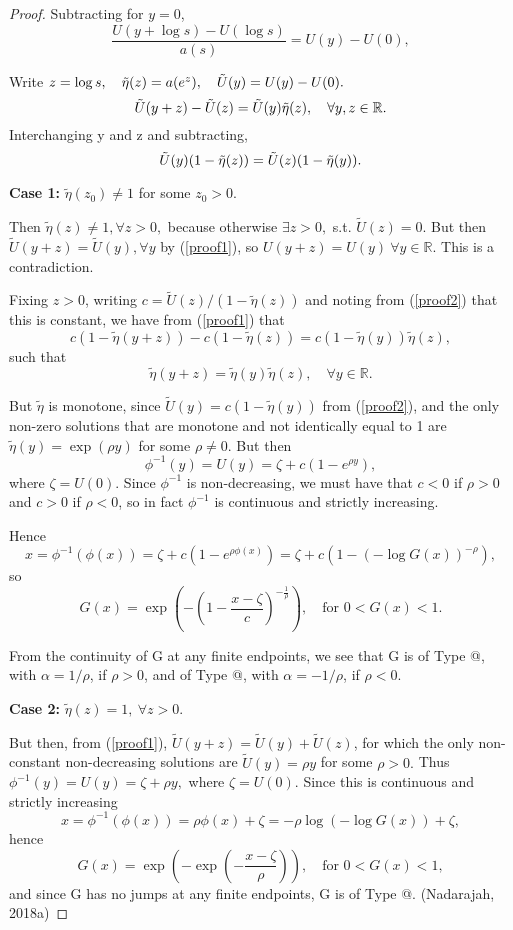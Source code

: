 \documentclass{article}
\makeatletter
\newcommand*{\rom}[1]{\expandafter\@slowromancap\romannumeral #1@}
\makeatother
\begin{document}
\begin{proof}
Subtracting for $y=0$,
$$\frac{U(y+\log s)-U(\log s)}{a(s)} = U(y) - U(0),$$

Write $z=\log s, \quad \tilde{\eta}(z)=a(e^{z}),\quad \Tilde{U}(y)=U(y)-U(0).$
\begin{equation}
    \Tilde{U}(y+z)-\Tilde{U}(z)=\Tilde{U}(y)\tilde{\eta}(z),\quad \forall y,z\in\mathbb{R}.\label{proof1}
\end{equation}
Interchanging y and z and subtracting,
\begin{equation}
    \Tilde{U}(y)(1-\tilde{\eta}(z))=\Tilde{U}(z)(1-\tilde{\eta}(y)).\label{proof2}
\end{equation}

\textbf{Case 1:} $\tilde{\eta}(z_0)\neq 1$ for some $z_0 > 0.$\vspace{0.5cm}

Then $\tilde{\eta}(z)\neq1, \forall z > 0,$ because otherwise $\exists z>0,$ s.t. $\tilde{U}(z) = 0.$ But then $\tilde{U}(y+z) =\tilde{U}(y),\forall y $ by (\ref{proof1}), so $U(y+z)=U(y) \ \forall y\in\mathbb{R}.$ This is a contradiction.

Fixing $z>0$, writing $c=\tilde{U}(z)/(1-\tilde{\eta}(z))$ and noting from (\ref{proof2}) that this is constant, we have from (\ref{proof1}) that
$$c(1-\tilde{\eta}(y+z))-c(1-\tilde{\eta}(z))=c(1-\tilde{\eta}(y))\tilde{\eta}(z),$$
such that
$$\tilde{\eta}(y+z)=\tilde{\eta}(y)\tilde{\eta}(z),\quad \forall y \in \mathbb{R}.$$

But $\tilde{\eta}$ is monotone, since $\tilde{U}(y)=c(1-\tilde{\eta}(y))$ from (\ref{proof2}), and the only non-zero solutions that are monotone and not identically equal to 1 are $\tilde{\eta}(y)=\exp(\rho y)$ for some $\rho \neq 0.$ But then
$$\phi^{-1}(y)=U(y)=\zeta + c(1-e^{\rho y}),$$
where $\zeta = U(0)$. Since $\phi^{-1}$ is non-decreasing, we must have that $c<0$ if $\rho>0$ and $c>0$ if $\rho<0$, so in fact $\phi^{-1}$ is continuous and strictly increasing.

Hence $$x=\phi^{-1}(\phi(x))=\zeta + c\left(1-e^{\rho\phi(x)}\right)=\zeta + c(1-(-\log G(x))^{-\rho}),$$
so $$G(x) = \exp\left(-\left(1-\frac{x-\zeta}{c}\right)^{-\frac{1}{\rho}}\right),\quad \text{for } 0<G(x)<1.$$

From the continuity of G at any finite endpoints, we see that G is of Type \rom{2}, with $\alpha=1/\rho$, if $\rho>0$, and of Type \rom{3}, with $\alpha = -1/\rho$, if $\rho <0.$\vspace{0.5cm}

\textbf{Case 2:} $\tilde{\eta}(z)=1, \ \forall z> 0.$

But then, from (\ref{proof1}), $\tilde{U}(y+z)=\tilde{U}(y)+\tilde{U}(z)$, for which the only non-constant non-decreasing solutions are $\tilde{U}(y)=\rho y$ for some $\rho>0.$ Thus $\phi^{-1}(y)=U(y)=\zeta +\rho y,$ where $\zeta = U(0).$ Since this is continuous and strictly increasing
$$x=\phi^{-1}(\phi(x))=\rho \phi(x)+\zeta = -\rho\log(-\log G(x)) + \zeta,$$
hence 
$$G(x)=\exp\left(-\exp\left(-\frac{x-\zeta}{\rho}\right)\right),\quad \text{for } 0<G(x)<1,$$
and since G has no jumps at any finite endpoints, G is of Type \rom{1}. (Nadarajah, 2018a)

\end{proof}
\end{document}
